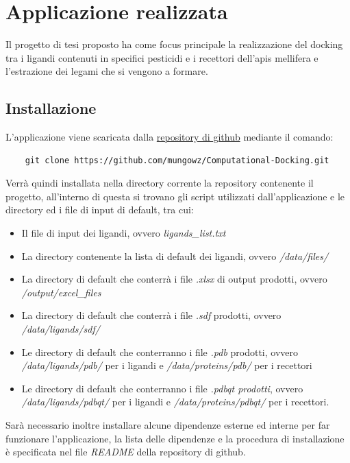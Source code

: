 \chapter{Applicazione realizzata}\label{cap:3}
Il progetto di tesi proposto ha come focus principale la realizzazione del docking tra i ligandi contenuti in specifici pesticidi e i recettori dell'apis mellifera e l'estrazione dei legami che si vengono a formare. 

\section{Installazione}\label{sec:3.1}
L'applicazione viene scaricata dalla \href{https://github.com/mungowz/Computational-Docking/tree/development}{repository di github} mediante il comando:

\begin{verbatim}
    git clone https://github.com/mungowz/Computational-Docking.git    
\end{verbatim}

Verrà quindi installata nella directory corrente la repository contenente il progetto, all'interno di questa si trovano gli script utilizzati dall'applicazione e le directory ed i file di input di default, tra cui:

\begin{itemize}
    \item Il file di input dei ligandi, ovvero \textit{ligands\_list.txt}
    \item La directory contenente la lista di default dei ligandi, ovvero \textit{/data/files/}
    \item La directory di default che conterrà i file \textit{.xlsx} di output prodotti, ovvero \textit{/output/excel\_files}
    \item La directory di default che conterrà i file \textit{.sdf} prodotti, ovvero \textit{/data/ligands/sdf/}
    \item Le directory di default che conterranno i file \textit{.pdb} prodotti, ovvero \textit{/data/ligands/pdb/} per i ligandi e \textit{/data/proteins/pdb/} per i recettori
    \item Le directory di default che conterranno i file \textit{.pdbqt prodotti}, ovvero \textit{/data/ligands/pdbqt/} per i ligandi e \textit{/data/proteins/pdbqt/} per i recettori.
\end{itemize}

Sarà necessario inoltre installare alcune dipendenze esterne ed interne per far funzionare l'applicazione, la lista delle dipendenze e la procedura di installazione è specificata nel file \textit{README} della repository di github.


